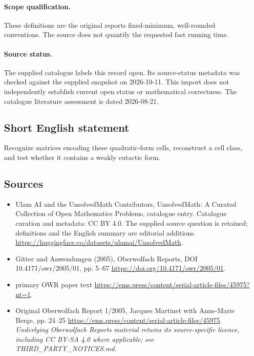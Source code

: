 \documentclass[11pt]{article}
\begin{document}
\paragraph{Scope qualification.}
These definitions are the original report\textquotesingle s fixed-minimum, well-rounded conventions. The source does not quantify the requested fast running time.
\paragraph{Source status.}
The supplied catalogue labels this record open. Its source-status metadata was checked against the supplied snapshot on 2026-10-11. This import does not independently establish current open status or mathematical correctness. The catalogue literature assessment is dated 2026-08-21.
\subsection{Short English statement}
Recognize matrices encoding these quadratic-form cells, reconstruct a cell class, and test whether it contains a weakly eutactic form.
\subsection{Sources}
\begin{itemize}
\item[S1] Ulam AI and the UnsolvedMath Contributors, UnsolvedMath: A Curated Collection of Open Mathematics Problems, catalogue entry. Catalogue curation and metadata: CC BY 4.0. The supplied source question is retained; definitions and the English summary are editorial additions.
\url{https://huggingface.co/datasets/ulamai/UnsolvedMath}.
\item[S2] Gitter und Anwendungen (2005), Oberwolfach Reports, DOI 10.4171/owr/2005/01, pp. 5--67
\url{https://doi.org/10.4171/owr/2005/01}.
\item[S3] primary OWR paper text
\url{https://ems.press/content/serial-article-files/45975?nt=1}.
\item[S4] Original Oberwolfach Report 1/2005, Jacques Martinet with Anne-Marie Berge, pp. 24--25
\url{https://ems.press/content/serial-article-files/45975}.
\textit{Underlying Oberwolfach Reports material retains its source-specific licence, including CC BY-SA 4.0 where applicable; see THIRD\_PARTY\_NOTICES.md.}
\end{itemize}
\end{document}
